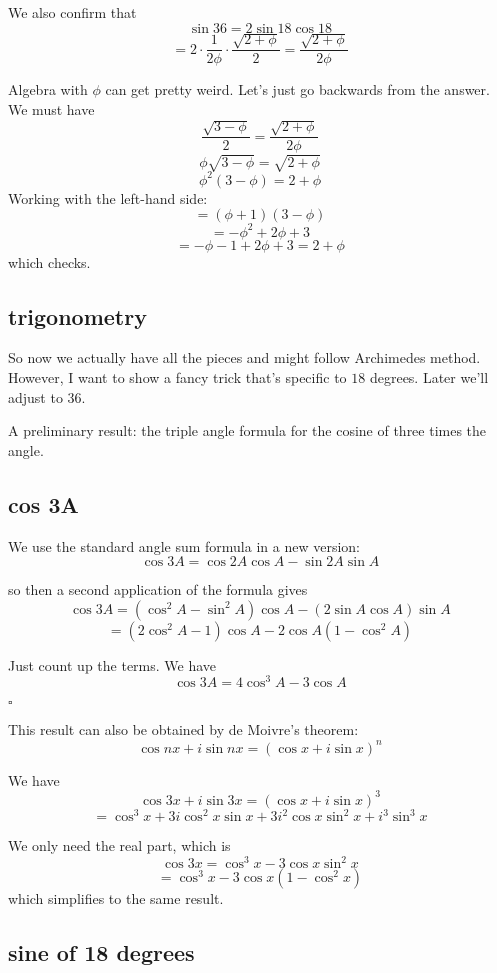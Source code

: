 \documentclass[11pt, oneside]{article}
\begin{document}
We also confirm that
\[ \sin 36 = 2 \sin 18 \cos 18 \]
\[ = 2 \cdot \frac{1}{2 \phi} \cdot \frac{\sqrt{2 + \phi}}{2} = \frac{\sqrt{2 + \phi}}{2 \phi} \]

Algebra with $\phi$ can get pretty weird.  Let's just go backwards from the answer.  We must have
\[  \frac{\sqrt{3 - \phi}}{2} =  \frac{\sqrt{2 + \phi}}{2 \phi} \]
\[ \phi \sqrt{3 - \phi} = \sqrt{2 + \phi} \]
\[ \phi^2(3 - \phi) = 2 + \phi \]
Working with the left-hand side:
\[ = (\phi + 1)(3 - \phi) \]
\[ = -\phi^2 + 2 \phi + 3 \]
\[ = - \phi - 1 + 2 \phi + 3 = 2 + \phi \]
which checks.

\subsection*{trigonometry}

So now we actually have all the pieces and might follow Archimedes method.  However, I want to show a fancy trick that's specific to $18$ degrees.  Later we'll adjust to $36$.

A preliminary result:  the triple angle formula for the cosine of three times the angle.

\subsection*{cos 3A}

We use the standard angle sum formula in a new version:
\[ \cos 3A = \cos 2A \cos A - \sin 2A \sin A \]

so then a second application of the formula gives
\[ \cos 3A = (\cos^2 A - \sin^2 A) \cos A - (2 \sin A \cos A) \sin A \]
\[ = (2 \cos^2 A - 1) \cos A - 2 \cos A (1 - \cos^2A) \]

Just count up the terms.  We have
\[ \cos 3A = 4 \cos^3 A - 3 \cos A \]

$\square$

This result can also be obtained by de Moivre's theorem:
\[ \cos nx + i \sin nx = (\cos x + i \sin x)^n \]

We have
\[ \cos 3x + i \sin 3x = (\cos x + i \sin x)^3 \]
\[ = \cos^3 x + 3i \cos^2 x \sin x + 3i^2 \cos x \sin^2 x + i^3 \sin^3 x \]

We only need the real part, which is
\[ \cos 3x = \cos^3 x - 3 \cos x \sin^2 x \]
\[ = \cos^3 x - 3 \cos x (1 - \cos^2 x) \]
which simplifies to the same result.

\subsection*{sine of 18 degrees}
\end{document}
